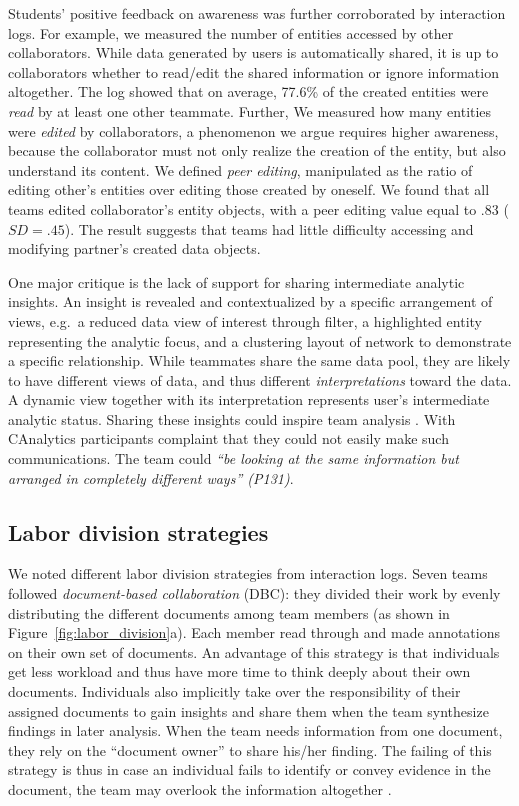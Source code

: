 Students' positive feedback on awareness was further corroborated by
interaction logs. For example, we measured the number of entities
accessed by other collaborators. While data
generated by users is automatically shared, it is up to collaborators
whether to read/edit the shared information or ignore information altogether.
The log showed that on average, 77.6\% of the created entities
were \emph{read} by at least one other teammate. Further, We measured how
many entities were \emph{edited} by collaborators, a phenomenon we argue
requires higher awareness, because the collaborator must not only realize
the creation of the entity, but also understand its content. We
defined \emph{peer editing}, manipulated as the ratio of editing other's
entities over editing those created by oneself. We found that all teams
edited collaborator's entity objects, with a peer editing value equal
to .83 ($SD=.45$). The result suggests that teams had little difficulty
accessing and modifying partner's created data objects.

One major critique is the lack of support for sharing intermediate analytic
insights. An insight is revealed and contextualized by a specific arrangement of views, e.g.~a reduced data view of interest through filter, a highlighted entity representing the analytic focus, and a clustering layout of network to demonstrate a specific relationship. While teammates share the same data pool, they are likely to have different views of data, and thus different \emph{interpretations}
toward the data. A dynamic view together with its interpretation represents
user's intermediate analytic status. Sharing these insights could inspire team analysis \cite{Gotz2009d}. With CAnalytics
participants complaint that they could not easily make such communications. The team could \emph{``be
looking at the same information but arranged in completely different
ways'' (P131)}.

\subsection{Labor division strategies}\label{labor-division-strategies}

We noted different labor division strategies from interaction logs. Seven
teams followed \emph{document-based collaboration} (DBC): they divided their
work by evenly distributing the different documents among team members
(as shown in Figure~\ref{fig:labor_division}a). Each member read
through and made annotations on their own set of documents. An advantage
of this strategy is that individuals get less workload and thus have
more time to think deeply about their own documents. Individuals also
implicitly take over the responsibility of their assigned documents to
gain insights and share them when the team synthesize findings in later
analysis. When the team needs information from one document, they rely
on the ``document owner'' to share his/her finding. The failing of this
strategy is thus in case an individual fails to identify or convey
evidence in the document, the team may overlook the information
altogether \cite{Borge2012}.

